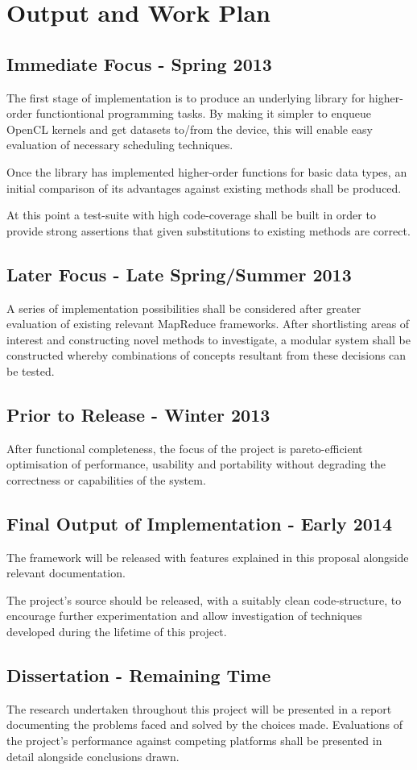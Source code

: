 \section{Output and Work Plan}
\subsection{Immediate Focus - Spring 2013}
The first stage of implementation is to produce an underlying library for higher-order functiontional programming tasks.
By making it simpler to enqueue OpenCL kernels and get datasets to/from the device, this will enable easy evaluation of necessary scheduling techniques.

Once the library has implemented higher-order functions for basic data types, an initial comparison of its advantages against existing methods shall be produced.

At this point a test-suite with high code-coverage shall be built in order to provide strong assertions that given substitutions to existing methods are correct.
\subsection{Later Focus - Late Spring/Summer 2013}
A series of implementation possibilities shall be considered after greater evaluation of existing relevant MapReduce frameworks. After shortlisting areas of interest and constructing novel methods to investigate, a modular system shall be constructed whereby combinations of concepts resultant from these decisions can be tested.
\subsection{Prior to Release - Winter 2013}
After functional completeness, the focus of the project is pareto-efficient optimisation of performance, usability and portability without degrading the correctness or capabilities of the system.
\subsection{Final Output of Implementation - Early 2014}
The framework will be released with features explained in this proposal alongside relevant documentation.

The project's source should be released, with a suitably clean code-structure, to encourage further experimentation and allow investigation of techniques developed during the lifetime of this project.

\subsection{Dissertation - Remaining Time}
The research undertaken throughout this project will be presented in a report documenting the problems faced and solved by the choices made. Evaluations of the project's performance against competing platforms shall be presented in detail alongside conclusions drawn.
